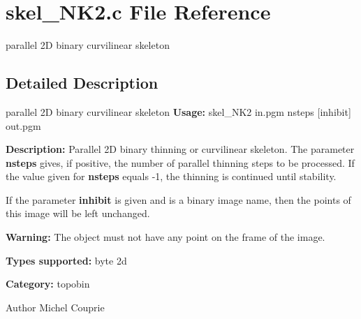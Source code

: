 \section{skel\_\-NK2.c File Reference}
\label{skel__NK2_8c}


parallel 2D binary curvilinear skeleton  




\subsection{Detailed Description}
parallel 2D binary curvilinear skeleton {\bfseries Usage:} skel\_\-NK2 in.pgm nsteps [inhibit] out.pgm

{\bfseries Description:} Parallel 2D binary thinning or curvilinear skeleton. The parameter {\bfseries nsteps} gives, if positive, the number of parallel thinning steps to be processed. If the value given for {\bfseries nsteps} equals -\/1, the thinning is continued until stability.

If the parameter {\bfseries inhibit} is given and is a binary image name, then the points of this image will be left unchanged.

{\bfseries Warning:} The object must not have any point on the frame of the image.

{\bfseries Types supported:} byte 2d

{\bfseries Category:} topobin

\begin{DoxyAuthor}{Author}
Michel Couprie 
\end{DoxyAuthor}
